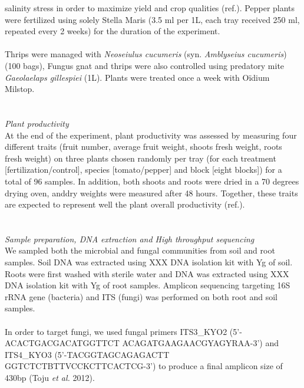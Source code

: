 \documentclass[11pt,]{article}
\begin{document}
salinity stress in order to maximize yield and crop qualities (ref.).
Pepper plants were fertilized using solely Stella Maris (3.5 ml per 1L,
each tray received 250 ml, repeated every 2 weeks) for the duration of
the experiment.\\
\hspace*{0.333em}\\
Thrips were managed with \emph{Neoseiulus cucumeris} (syn.
\emph{Amblyseius cucumeris}) (100 bags), Fungus gnat and thrips were
also controlled using predatory mite \emph{Gaeolaelaps gillespiei} (1L).
Plants were treated once a week with Oïdium Milstop.\\
\hspace*{0.333em}\\
\hspace*{0.333em}\\
\emph{Plant productivity}\\
At the end of the experiment, plant productivity was assessed by
measuring four different traits (fruit number, average fruit weight,
shoots fresh weight, roots fresh weight) on three plants chosen randomly
per tray (for each treatment {[}fertilization/control{]}, species
{[}tomato/pepper{]} and block {[}eight blocks{]}) for a total of 96
samples. In addition, both shoots and roots were dried in a 70 degrees
drying oven, anddry weights were measured after 48 hours. Together,
these traits are expected to represent well the plant overall
productivity (ref.).\\
\hspace*{0.333em}\\
\hspace*{0.333em}\\
\emph{Sample preparation, DNA extraction and High throughput
sequencing}\\
We sampled both the microbial and fungal communities from soil and root
samples. Soil DNA was extracted using XXX DNA isolation kit with Yg of
soil. Roots were first washed with sterile water and DNA was extracted
using XXX DNA isolation kit with Yg of root samples. Amplicon sequencing
targeting 16S rRNA gene (bacteria) and ITS (fungi) was performed on both
root and soil samples.\\
\hspace*{0.333em}\\
In order to target fungi, we used fungal primers ITS3\_KYO2
(5'-ACACTGACGACATGGTTCT ACAGATGAAGAACGYAGYRAA-3') and ITS4\_KYO3
(5'-TACGGTAGCAGAGACTT GGTCTCTBTTVCCKCTTCACTCG-3') to produce a final
amplicon size of 430bp (Toju \emph{et al.} 2012).\\
\end{document}
